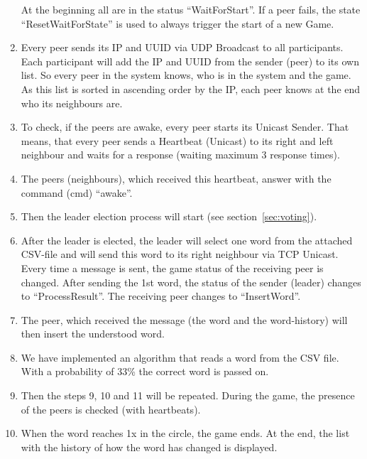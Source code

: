 \documentclass[runningheads]{llncs}
\begin{document}
\begin{enumerate}
        At the beginning all are in the status \enquote{WaitForStart}. If a peer fails, the state \enquote{ResetWaitForState} is used to always trigger the start of a new Game.
        \item Every peer sends its IP and UUID via UDP Broadcast to all participants. Each participant will add the IP and UUID from the sender (peer) to its own list. So every peer in the system knows, who is in the system and the game. As this list is sorted in ascending order by the IP, each peer knows at the end who its neighbours are. 
        \item To check, if the peers are awake, every peer starts its Unicast Sender. That means, that every peer sends a Heartbeat (Unicast) to its right and left neighbour and waits for a response (waiting maximum 3 response times).
        \item The peers (neighbours), which received this heartbeat, answer with the command (cmd) \enquote{awake}.
        \item Then the leader election process will start (see section~\ref{sec:voting}).
        \item After the leader is elected, the leader will select one word from the attached CSV-file and will send this word to its right neighbour via TCP Unicast. Every time a message is sent, the game status of the receiving peer is changed. After sending the 1st word, the status of the sender (leader) changes to \enquote{ProcessResult}. The receiving peer changes to \enquote{InsertWord}.
        \item The peer, which received the message (the word and the word-history) will then insert the understood word.
        \item We have implemented an algorithm that reads a word from the CSV file. With a probability of 33\% the correct word is passed on.
        \item Then the steps 9, 10 and 11 will be repeated. During the game, the presence of the peers is checked (with heartbeats).
        \item When the word reaches 1x in the circle, the game ends. At the end, the list with the history of how the word has changed is displayed.
    \end{enumerate}
    
\end{document}
